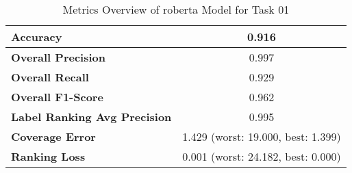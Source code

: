 \begin{table}[h]
\begin{tabular}{|l|c|c|c|c|}
\textbf{Accuracy}                    & \multicolumn{4}{c|}{0.916}                                 \\ \hline
\textbf{Overall Precision}           & \multicolumn{4}{c|}{0.997}                                \\ \hline
\textbf{Overall Recall}              & \multicolumn{4}{c|}{0.929}                                   \\ \hline
\textbf{Overall F1-Score}            & \multicolumn{4}{c|}{0.962}                                  \\ \hline
\textbf{Label Ranking Avg Precision} & \multicolumn{4}{c|}{0.995}                                    \\ \hline
\textbf{Coverage Error}              & \multicolumn{4}{c|}{1.429 (worst: 19.000, best: 1.399)}                             \\ \hline
\textbf{Ranking Loss}                & \multicolumn{4}{c|}{0.001 (worst: 24.182, best: 0.000)}                             \\ \hline
\end{tabular}

\caption{Metrics Overview of roberta Model for Task 01}
\label{table:roberta_metrics_task_01}
\end{table}
    